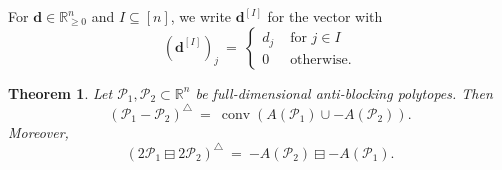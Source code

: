 \documentclass[11pt]{amsart}
\newtheorem{thm}{Theorem}[section]
\theoremstyle{definition}
\begin{document}
For ${\mathbf{d}} \in {\mathbb{R}}^n_{\ge 0}$ and $I \subseteq [n]$, we write ${{{\mathbf{d}}}^{[{I}]}}$
for the vector with
\[
    ({{{\mathbf{d}}}^{[{I}]}})_j \ = \
        \begin{cases}
            d_j & \text{ for } j \in I \\
            0 & \text{ otherwise}.
        \end{cases}
\]

\begin{thm}\label{thm:CayleyAnti}
    Let ${\mathcal{P}}_1,{\mathcal{P}}_2 \subset {\mathbb{R}}^n$ be full-dimensional anti-blocking
    polytopes. Then
    \[
        ({\mathcal{P}}_1 - {\mathcal{P}}_2)^{\triangle}  \ = \ \operatorname{conv}( {A({{{\mathcal{P}}_1}})} \cup -{A({{{\mathcal{P}}_2}})} ).
    \]
    Moreover, 
    \[
        ({{{2{\mathcal{P}}_1} \boxminus {2{\mathcal{P}}_2}}})^{\triangle} 
        \ = \ {{{-{A({{{\mathcal{P}}_2}})}} \boxminus {-{A({{{\mathcal{P}}_1}})}}}}.
    \]
\end{thm}
\end{document}
